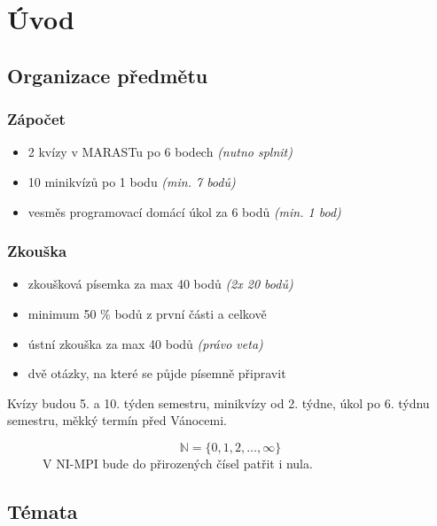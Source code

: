 \section{Úvod}

\vspace{12pt}

\subsection{Organizace předmětu}

\subsubsection*{Zápočet}

\begin{itemize}
    \item 2 kvízy v MARASTu po 6 bodech \textit{(nutno splnit)}
    \item 10 minikvízů po 1 bodu \textit{(min. 7 bodů)}
    \item vesměs programovací domácí úkol za 6 bodů \textit{(min. 1 bod)}
\end{itemize}

\subsubsection*{Zkouška}

\begin{itemize}
    \item zkoušková písemka za max 40 bodů \textit{(2x 20 bodů)}
    \item minimum 50 \% bodů z první části a celkově
    \item ústní zkouška za max 40 bodů \textit{(právo veta)}
    \item dvě otázky, na které se půjde písemně připravit
\end{itemize}

Kvízy budou 5. a 10. týden semestru, minikvízy od 2. týdne, úkol po 6. týdnu semestru, měkký termín před Vánocemi.

\begin{figure}[H]
    \centering
    \begin{equation}
        \mathbb{N} = \{0, 1, 2, \ldots, \infty\}
    \end{equation}
    V NI-MPI bude do přirozených čísel patřit i nula.
\end{figure}

\subsection{Témata}

